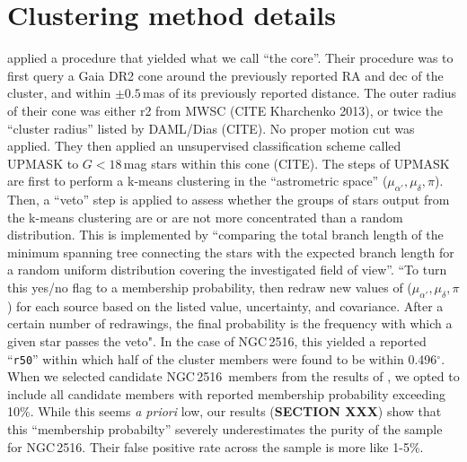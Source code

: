 \documentclass[12pt,twocolumn,tighten]{aastex63}
\newcommand{\cn}{NGC\,2516} %
\begin{document}
% 
% 
% 
% 
% 
% 

\clearpage
                            
 

\appendix
\section{Clustering method details}
\label{app:clustering}

%
%
 applied a procedure that 
yielded what we call ``the core''.  Their procedure was to first query
a Gaia DR2 cone around the previously reported RA and dec of the
cluster, and within $\pm 0.5$\,mas of its previously reported
distance. 
The outer radius of their cone was either r2 from MWSC (CITE
Kharchenko 2013), or twice the ``cluster radius'' listed by DAML/Dias (CITE).  No
proper motion cut was applied.  They then applied an unsupervised
classification scheme called UPMASK to $G<18$\,mag stars within this
cone (CITE).  The steps of UPMASK are first to perform a k-means
clustering in the ``astrometric space'' ($\mu_{\alpha'}, \mu_\delta,
\pi$).  Then, a ``veto'' step is applied to assess whether the groups
of stars output from the k-means clustering are or are not more
concentrated than a random distribution.  This is implemented by
``comparing the total branch length of the minimum spanning tree
connecting the stars with the expected branch length for a random
uniform distribution covering the investigated field of view''.  ``To
turn this yes/no flag to a membership probability,
\citet{cantatgaudin_gaia_2018} then redraw new values of
($\mu_{\alpha'}, \mu_\delta, \pi$) for each source based on the listed
value, uncertainty, and covariance.  After a certain number of
redrawings, the final probability is the frequency with which a given
star passes the veto".  In the case of \cn, this yielded a reported
``\texttt{r50}'' within which half of the cluster members were found
to be within 0.496$^\circ$.
When we selected candidate \cn\ members from the results of
, we opted to include all candidate members
with reported membership probability exceeding 10\%.
While this seems {\it a priori} low, our results ({\bf SECTION XXX})
show that this ``membership probabilty'' severely underestimates the
purity of the  sample for \cn. 
Their false positive rate across the sample is more like 1-5\%.
\end{document}
